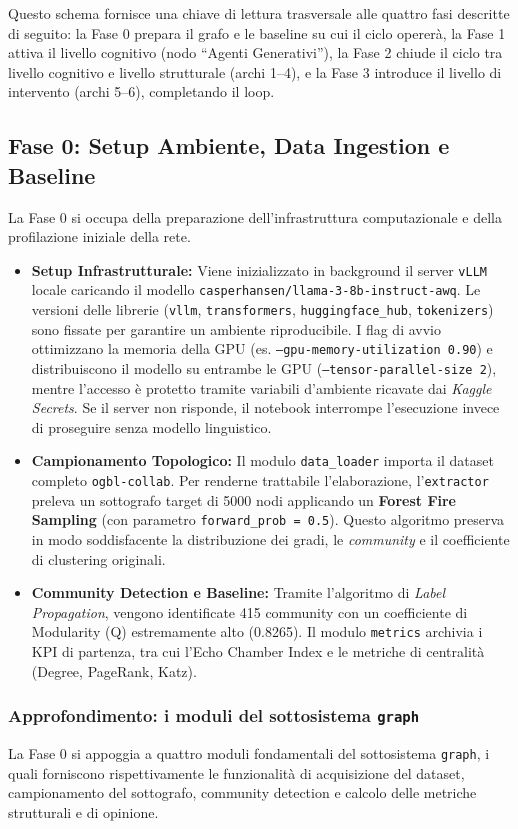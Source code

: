 \documentclass[11pt, a4paper]{article}
\begin{document}
Questo schema fornisce una chiave di lettura trasversale alle quattro fasi descritte di seguito: la Fase 0 prepara il grafo e le baseline su cui il ciclo opererà, la Fase 1 attiva il livello cognitivo (nodo ``Agenti Generativi''), la Fase 2 chiude il ciclo tra livello cognitivo e livello strutturale (archi 1--4), e la Fase 3 introduce il livello di intervento (archi 5--6), completando il loop.

\subsection{Fase 0: Setup Ambiente, Data Ingestion e Baseline}
La Fase 0 si occupa della preparazione dell'infrastruttura computazionale e della profilazione iniziale della rete.
\begin{itemize}[leftmargin=*]
    \item \textbf{Setup Infrastrutturale:} Viene inizializzato in background il server \texttt{vLLM} locale caricando il modello \texttt{casperhansen/llama-3-8b-instruct-awq}. Le versioni delle librerie (\texttt{vllm}, \texttt{transformers}, \texttt{huggingface\_hub}, \texttt{tokenizers}) sono fissate per garantire un ambiente riproducibile. I flag di avvio ottimizzano la memoria della GPU (es. \texttt{--gpu-memory-utilization 0.90}) e distribuiscono il modello su entrambe le GPU (\texttt{--tensor-parallel-size 2}), mentre l'accesso è protetto tramite variabili d'ambiente ricavate dai \textit{Kaggle Secrets}. Se il server non risponde, il notebook interrompe l'esecuzione invece di proseguire senza modello linguistico.
    \item \textbf{Campionamento Topologico:} Il modulo \texttt{data\_loader} importa il dataset completo \texttt{ogbl-collab}. Per renderne trattabile l'elaborazione, l'\texttt{extractor} preleva un sottografo target di 5000 nodi applicando un \textbf{Forest Fire Sampling} (con parametro \texttt{forward\_prob = 0.5}). Questo algoritmo preserva in modo soddisfacente la distribuzione dei gradi, le \textit{community} e il coefficiente di clustering originali.
    \item \textbf{Community Detection e Baseline:} Tramite l'algoritmo di \textit{Label Propagation}, vengono identificate 415 community con un coefficiente di Modularity (Q) estremamente alto (0.8265). Il modulo \texttt{metrics} archivia i KPI di partenza, tra cui l'Echo Chamber Index e le metriche di centralità (Degree, PageRank, Katz).
\end{itemize}

\subsubsection{Approfondimento: i moduli del sottosistema \texttt{graph}}
La Fase 0 si appoggia a quattro moduli fondamentali del sottosistema \texttt{graph}, i quali forniscono rispettivamente le funzionalità di acquisizione del dataset, campionamento del sottografo, community detection e calcolo delle metriche strutturali e di opinione.
\end{document}
